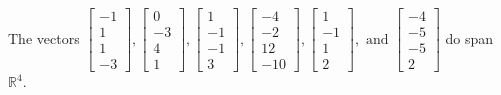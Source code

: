 \begin{exercise}
\begin{exerciseStatement}
  \end{exerciseStatement}
  \begin{exerciseAnswer}
   The vectors \(\left[\begin{array}{r}
-1 \\
1 \\
1 \\
-3
\end{array}\right] , \left[\begin{array}{r}
0 \\
-3 \\
4 \\
1
\end{array}\right] , \left[\begin{array}{r}
1 \\
-1 \\
-1 \\
3
\end{array}\right] , \left[\begin{array}{r}
-4 \\
-2 \\
12 \\
-10
\end{array}\right] , \left[\begin{array}{r}
1 \\
-1 \\
1 \\
2
\end{array}\right] , \text{ and } \left[\begin{array}{r}
-4 \\
-5 \\
-5 \\
2
\end{array}\right]\) 
  	 do  
	span \(\mathbb{R}^4\).
  


  \end{exerciseAnswer}
\end{exercise}